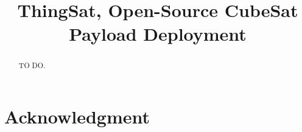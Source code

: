 \documentclass[conference]{IEEEtran}
\begin{document}

\title{ThingSat, Open-Source CubeSat Payload Deployment}

\author{
}

\maketitle

\begin{abstract}
TO DO.
\end{abstract}

\IEEEpeerreviewmaketitle












\section*{Acknowledgment}



\end{document}

